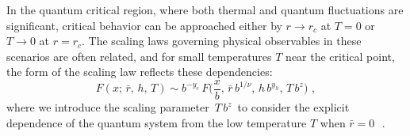 In the quantum critical region, where both thermal and quantum fluctuations are significant, critical behavior can be approached either by $ r \rightarrow r_c $ at $ T = 0 $ or $ T \rightarrow 0 $ at $ r = r_c $. The scaling laws governing physical observables in these scenarios are often related, and for small temperatures $ T $ near the critical point, the form of the scaling law reflects these dependencies:
\begin{equation}
	\label{scalinglawT}
	F(x;\,\bar r,\,h,\,T) \sim b^{-y_c} \, F\biggl( \frac{x}{b} , \,\bar r \,b^{1/\nu}, \, h\,b^{y_h} , \,T\,b^z \biggl) \,\, ,
\end{equation}
where we introduce the scaling parameter $\,T\,b^z \,$ to consider the explicit dependence of the quantum system from the low temperature $T$ when $\bar r=0\,$~\cite{S99}.



